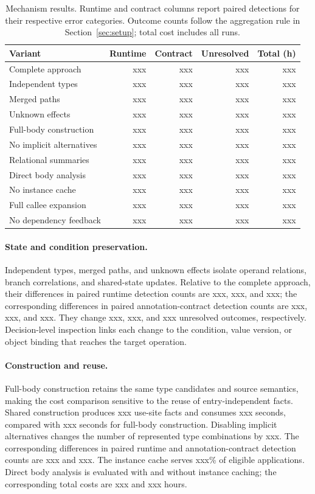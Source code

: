 \begin{table}[t]
\centering
\small
\caption{Mechanism results. Runtime and contract columns report paired detections for their respective error categories. Outcome counts follow the aggregation rule in Section~\ref{sec:setup}; total cost includes all runs.}
\label{tab:mechanism-results}
\begin{tabular}{lrrrr}
\toprule
Variant & Runtime & Contract & Unresolved & Total (h)\\
\midrule
Complete approach & xxx & xxx & xxx & xxx\\
Independent types & xxx & xxx & xxx & xxx\\
Merged paths & xxx & xxx & xxx & xxx\\
Unknown effects & xxx & xxx & xxx & xxx\\
Full-body construction & xxx & xxx & xxx & xxx\\
No implicit alternatives & xxx & xxx & xxx & xxx\\
Relational summaries & xxx & xxx & xxx & xxx\\
Direct body analysis & xxx & xxx & xxx & xxx\\
No instance cache & xxx & xxx & xxx & xxx\\
Full callee expansion & xxx & xxx & xxx & xxx\\
No dependency feedback & xxx & xxx & xxx & xxx\\
\bottomrule
\end{tabular}
\end{table}

\paragraph{State and condition preservation.}
Independent types, merged paths, and unknown effects isolate operand
relations, branch correlations, and shared-state updates. Relative to the complete approach, their differences in paired runtime
detection counts are xxx, xxx, and xxx; the corresponding differences in
paired annotation-contract detection counts are xxx, xxx, and xxx. They
change xxx, xxx, and xxx unresolved outcomes, respectively.
Decision-level inspection links each change to the condition, value
version, or object binding that reaches the target operation.

\paragraph{Construction and reuse.}
Full-body construction retains the same type candidates and source
semantics, making the cost comparison sensitive to the reuse of
entry-independent facts. Shared construction produces xxx use-site facts
and consumes xxx seconds, compared with xxx seconds for full-body
construction. Disabling implicit alternatives changes the number of
represented type combinations by xxx. The corresponding differences in
paired runtime and annotation-contract detection counts are xxx and xxx.
The instance cache serves xxx\% of eligible applications. Direct body
analysis is evaluated with and without instance caching; the corresponding
total costs are xxx and xxx hours.

